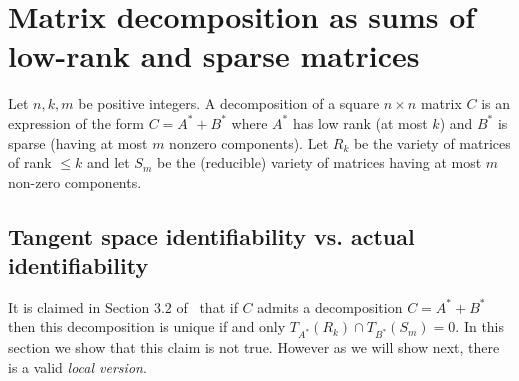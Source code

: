 \documentclass[12pt]{amsart}
\numberwithin{equation}{section}
\begin{document}
\section{Matrix decomposition as sums of low-rank and sparse matrices}

Let $n,k,m$ be positive integers. A decomposition of a square $n\times n$ matrix $C$ is an expression of the form $C=A^*+B^*$ where $A^*$ has low rank (at most $k$) and $B^*$ is sparse (having at most $m$ nonzero components). Let $R_k$ be the variety of matrices of rank $\leq k$ and let $S_m$ be the (reducible) variety of matrices having at most $m$ non-zero components.


\subsection{Tangent space identifiability vs. actual identifiability}

It is claimed in Section $3.2$ of~\cite{IncoherenceDecomposition} that if $C$ admits a decomposition $C=A^*+B^*$ then this decomposition is unique if and only  $T_{A^*}(R_{k})\cap T_{B^*}(S_m)=0$. In this section we show that this claim is not true. However as we will show next, there is a valid {\it local version}. 
\end{document}
